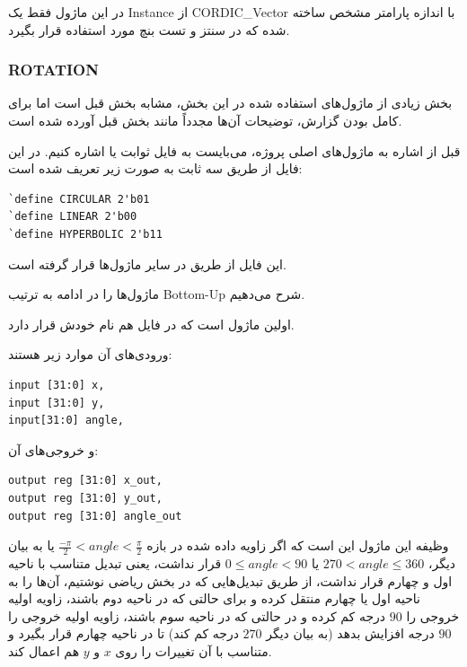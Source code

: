 \documentclass[12pt,titlepage,a4page , tikz , multi,table , svgnames,xcdraw]{article}
\begin{document}
در این ماژول فقط یک Instance از CORDIC\_Vector با اندازه پارامتر مشخص ساخته شده که در سنتز و تست بنچ مورد استفاده قرار بگیرد.


\newpage
\subsubsection{ROTATION}
بخش زیادی از ماژول‌های استفاده شده در این بخش، مشابه بخش قبل است اما برای کامل بودن گزارش، توضیحات آن‌ها مجدداً مانند بخش قبل آورده شده است.




قبل از اشاره به ماژول‌های اصلی پروژه، می‌بایست به فایل ثوابت یا  اشاره کنیم. در این فایل از طریق  سه ثابت به صورت زیر تعریف شده است:
\begin{latin}
\begin{verbatim}
`define CIRCULAR 2'b01
`define LINEAR 2'b00
`define HYPERBOLIC 2'b11
\end{verbatim}
\end{latin}

این فایل از طریق  در سایر ماژول‌ها قرار گرفته است.

ماژول‌ها را در ادامه به ترتیب Bottom-Up شرح می‌دهیم.

اولین ماژول  است که در فایل هم نام خودش قرار دارد. 

 ورودی‌های آن موارد زیر هستند:

\begin{latin}
\begin{verbatim}
input [31:0] x,
input [31:0] y,
input[31:0] angle,
\end{verbatim}
\end{latin}

و خروجی‌های آن:

\begin{latin}
\begin{verbatim}
output reg [31:0] x_out,
output reg [31:0] y_out,
output reg [31:0] angle_out
\end{verbatim}
\end{latin}

وظیفه این ماژول این است که اگر زاویه داده شده در بازه
 $\frac{-\pi}{2} < angle < \frac{\pi}{2}$
 یا به بیان دیگر،
 $270 < angle \leq 360$
 یا
 $0 \leq angle <90$
 قرار نداشت،
یعنی تبدیل متناسب با ناحیه اول و چهارم قرار نداشت، از طریق تبدیل‌هایی که در بخش ریاضی نوشتیم، آن‌ها را به ناحیه اول یا چهارم منتقل کرده و برای حالتی که در ناحیه دوم باشند، زاویه اولیه خروجی را $90$ درجه کم کرده و در حالتی که در ناحیه سوم باشند، زاویه اولیه خروجی را $90$ درجه افزایش بدهد (به بیان دیگر $270$ درجه کم کند) تا در ناحیه چهارم قرار بگیرد و متناسب با آن تغییرات را روی $x$ و $y$ هم اعمال کند.
\end{document}
